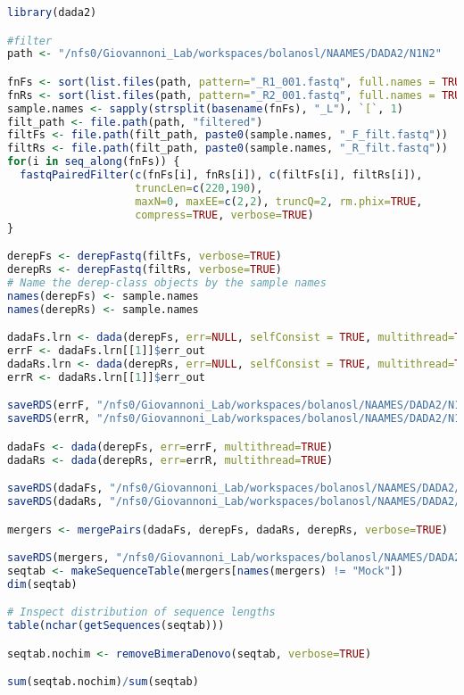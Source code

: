 \documentclass{article}
\begin{document}
\begin{lstlisting}[language=R,caption={DadaR.R}]
library(dada2)

#filter
path <- "/nfs0/Giovannoni_Lab/workspaces/bolanosl/NAAMES/DADA2/N1N2"

fnFs <- sort(list.files(path, pattern="_R1_001.fastq", full.names = TRUE))
fnRs <- sort(list.files(path, pattern="_R2_001.fastq", full.names = TRUE))
sample.names <- sapply(strsplit(basename(fnFs), "_L"), `[`, 1)
filt_path <- file.path(path, "filtered")
filtFs <- file.path(filt_path, paste0(sample.names, "_F_filt.fastq"))
filtRs <- file.path(filt_path, paste0(sample.names, "_R_filt.fastq"))
for(i in seq_along(fnFs)) {
  fastqPairedFilter(c(fnFs[i], fnRs[i]), c(filtFs[i], filtRs[i]),
                    truncLen=c(220,190), 
                    maxN=0, maxEE=c(2,2), truncQ=2, rm.phix=TRUE,
                    compress=TRUE, verbose=TRUE)
}

derepFs <- derepFastq(filtFs, verbose=TRUE)
derepRs <- derepFastq(filtRs, verbose=TRUE)
# Name the derep-class objects by the sample names
names(derepFs) <- sample.names
names(derepRs) <- sample.names

dadaFs.lrn <- dada(derepFs, err=NULL, selfConsist = TRUE, multithread=TRUE)
errF <- dadaFs.lrn[[1]]$err_out
dadaRs.lrn <- dada(derepRs, err=NULL, selfConsist = TRUE, multithread=TRUE)
errR <- dadaRs.lrn[[1]]$err_out

saveRDS(errF, "/nfs0/Giovannoni_Lab/workspaces/bolanosl/NAAMES/DADA2/N1N2/errF.rds")
saveRDS(errR, "/nfs0/Giovannoni_Lab/workspaces/bolanosl/NAAMES/DADA2/N1N2/errR.rds")

dadaFs <- dada(derepFs, err=errF, multithread=TRUE)
dadaRs <- dada(derepRs, err=errR, multithread=TRUE)

saveRDS(dadaFs, "/nfs0/Giovannoni_Lab/workspaces/bolanosl/NAAMES/DADA2/N1N2/dadaFs_N.rds")
saveRDS(dadaRs, "/nfs0/Giovannoni_Lab/workspaces/bolanosl/NAAMES/DADA2/N1N2/dadaRs_N.rds")

mergers <- mergePairs(dadaFs, derepFs, dadaRs, derepRs, verbose=TRUE)

saveRDS(mergers, "/nfs0/Giovannoni_Lab/workspaces/bolanosl/NAAMES/DADA2/N1N2/mergers.rds")
seqtab <- makeSequenceTable(mergers[names(mergers) != "Mock"])
dim(seqtab)

# Inspect distribution of sequence lengths
table(nchar(getSequences(seqtab)))

seqtab.nochim <- removeBimeraDenovo(seqtab, verbose=TRUE)

sum(seqtab.nochim)/sum(seqtab)


\end{lstlisting}
\end{document}
